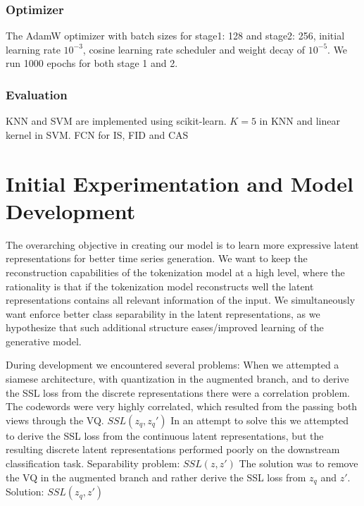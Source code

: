 \documentclass[../../thesis.tex]{subfiles}
\begin{document}
\subsubsection{Optimizer}
The AdamW optimizer with batch sizes for stage1: 128 and stage2: 256, initial learning rate $10^{-3}$, cosine learning rate scheduler and weight decay of $10^{-5}$. We run 1000 epochs for both stage 1 and 2. 

\subsubsection{Evaluation}
KNN and SVM are implemented using scikit-learn. $K=5$ in KNN and linear kernel in SVM.\newline
FCN for IS, FID and CAS

\section{Initial Experimentation and Model Development}

The overarching objective in creating our model is to learn more expressive latent representations for better time series generation. We want to keep the reconstruction capabilities of the tokenization model at a high level, where the rationality is that if the tokenization model reconstructs well the latent representations contains all relevant information of the input. We simultaneously want enforce better class separability in the latent representations, as we hypothesize that such additional structure eases/improved learning of the generative model.\newline

During development we encountered several problems:\newline
When we attempted a siamese architecture, with quantization in the augmented branch, and to derive the SSL loss from the discrete representations there were a correlation problem. The codewords were very highly correlated, which resulted from the passing both views through the VQ.  $SSL(z_q,z_q')$ \newline
In an attempt to solve this we attempted to derive the SSL loss from the continuous latent representations, but the resulting discrete latent representations performed poorly on the downstream classification task. Separability problem: $SSL(z,z')$ \newline
The solution was to remove the VQ in the augmented branch and rather derive the SSL loss from $z_q$ and $z'$. Solution: $SSL(z_q,z')$ \newline
\end{document}
